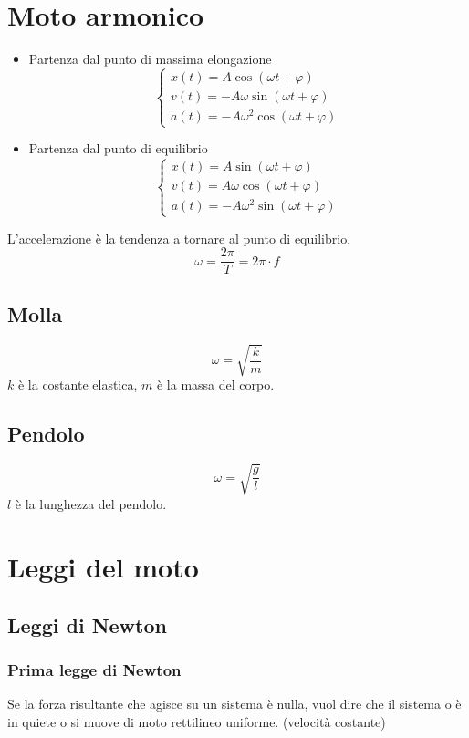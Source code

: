 \documentclass[a4paper]{article}
\theoremstyle{break}
\theoremstyle{break}
\theoremstyle{break}
\theoremstyle{break}
\begin{document}
\section{Moto armonico}
\begin{itemize}
  \item Partenza dal punto di massima elongazione
    \[
      \begin{cases}
        x(t) = A \cos(\omega t + \varphi)\\
        v(t) = -A \omega \sin(\omega t + \varphi)\\
        a(t) = -A \omega^2 \cos(\omega t + \varphi)
      \end{cases}
    \] 
  \item Partenza dal punto di equilibrio
    \[
      \begin{cases}
        x(t) = A \sin(\omega t + \varphi )\\
        v(t) = A \omega \cos(\omega t + \varphi )\\
        a(t) = -A \omega^2 \sin(\omega t + \varphi )
      \end{cases}
    \]
\end{itemize}
L'accelerazione è la tendenza a tornare al punto di equilibrio.
\[
\omega = \frac{2 \pi}{T} = 2 \pi \cdot f
\] 
\subsection{Molla}
\[
  \omega = \sqrt{\frac{k}{m}}
\] 
\( k \) è la costante elastica, \( m \) è la massa del corpo. 

\subsection{Pendolo}
\[
  \omega = \sqrt{\frac{g}{l}}
\]
\( l \) è la lunghezza del pendolo.

\section{Leggi del moto}
\subsection{Leggi di Newton}
\subsubsection{Prima legge di Newton}
Se la forza risultante che agisce su un sistema è nulla, vuol dire che il sistema o è in quiete o si muove
di moto rettilineo uniforme. (velocità costante)
\end{document}
